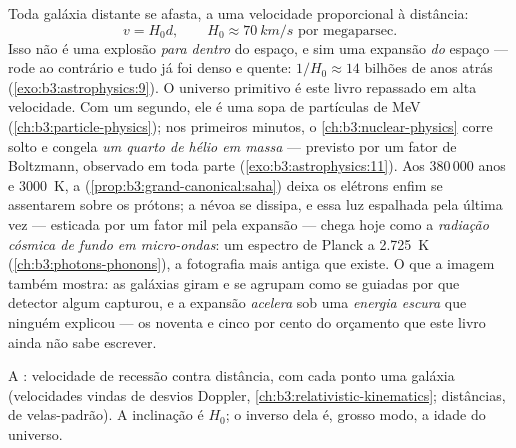 \begin{definition}\label{def:b3:astrophysics:hubble}
Toda galáxia distante se afasta, a uma velocidade proporcional à distância:
\[
v = H_0d , \qquad H_0 \approx \qty{70}{km/s}
\text{ por megaparsec} .
\]
Isso não é uma explosão \emph{para dentro} do espaço, e sim uma expansão
\emph{do} espaço --- rode ao contrário e tudo já foi
denso e quente: $1/H_0 \approx 14$ bilhões de anos atrás
(\cref{exo:b3:astrophysics:9}). O universo primitivo é este livro
repassado em alta velocidade. Com um segundo, ele é uma sopa de
partículas de \unit{MeV} (\cref{ch:b3:particle-physics}); nos primeiros
minutos, o \cref{ch:b3:nuclear-physics} corre solto e congela
\emph{um quarto de hélio em massa} --- previsto por um fator de
Boltzmann, observado em toda parte
(\cref{exo:b3:astrophysics:11}). Aos 380\,000 anos e
\qty{3000}{K}, a 
(\cref{prop:b3:grand-canonical:saha}) deixa os elétrons enfim se
assentarem sobre os prótons; a névoa se dissipa, e essa luz espalhada
pela última vez --- esticada por um fator mil pela expansão --- chega
hoje como a \emph{radiação cósmica de fundo em micro-ondas}: um espectro
de Planck a \qty{2.725}{K} (\cref{ch:b3:photons-phonons}), a fotografia
mais antiga que existe. O que a imagem também mostra: as galáxias giram e
se agrupam como se guiadas por \emph{} que detector algum
capturou, e a expansão \emph{acelera} sob uma \emph{energia escura}
que ninguém explicou --- os noventa e cinco por cento do orçamento
que este livro ainda não sabe escrever.
\end{definition}

\begin{omfigure}

{\small A : velocidade de recessão contra distância, com
cada ponto uma galáxia (velocidades vindas de desvios Doppler,
\cref{ch:b3:relativistic-kinematics}; distâncias, de velas-padrão). A
inclinação é $H_0$; o inverso dela é, grosso modo, a idade
do universo.}
\end{omfigure}

